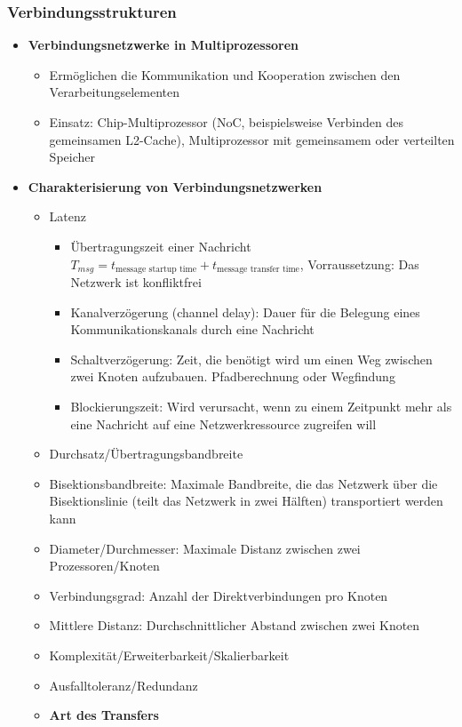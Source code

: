 \subsubsection{Verbindungsstrukturen}
\begin{itemize}
	\item \textbf{Verbindungsnetzwerke in Multiprozessoren}
	\begin{itemize}
		\item Ermöglichen die Kommunikation und Kooperation zwischen den Verarbeitungselementen
		\item Einsatz: Chip-Multiprozessor (NoC, beispielsweise Verbinden des gemeinsamen L2-Cache), Multiprozessor mit gemeinsamem oder verteilten Speicher
	\end{itemize}
	\item \textbf{Charakterisierung von Verbindungsnetzwerken}
	\begin{itemize}
		\item Latenz
		\begin{itemize}
			\item Übertragungszeit einer Nachricht \(T_{msg}=t_{\text{message startup time}}+t_{\text{message transfer time}}\), Vorraussetzung: Das Netzwerk ist konfliktfrei
			\item Kanalverzögerung (channel delay): Dauer für die Belegung eines Kommunikationskanals durch eine Nachricht
			\item Schaltverzögerung: Zeit, die benötigt wird um einen Weg zwischen zwei Knoten aufzubauen. Pfadberechnung oder Wegfindung
			\item Blockierungszeit: Wird verursacht, wenn zu einem Zeitpunkt mehr als eine Nachricht auf eine Netzwerkressource zugreifen will
		\end{itemize}
		\item Durchsatz/Übertragungsbandbreite
		\item Bisektionsbandbreite: Maximale Bandbreite, die das Netzwerk über die Bisektionslinie (teilt das Netzwerk in zwei Hälften) transportiert werden kann
		\item Diameter/Durchmesser: Maximale Distanz zwischen zwei Prozessoren/Knoten
		\item Verbindungsgrad: Anzahl der Direktverbindungen pro Knoten
		\item Mittlere Distanz: Durchschnittlicher Abstand zwischen zwei Knoten
		\item Komplexität/Erweiterbarkeit/Skalierbarkeit
		\item Ausfalltoleranz/Redundanz
		\item \textbf{Art des Transfers}

\end{itemize}
\end{itemize}
